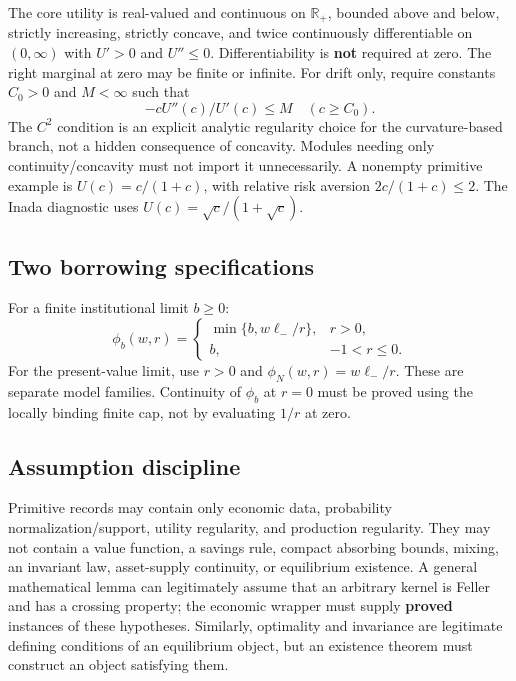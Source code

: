 \documentclass[
  11pt,
]{article}
\begin{document}
The core utility is real-valued and continuous on \(\mathbb R_+\),
bounded above and below, strictly increasing, strictly concave, and
twice continuously differentiable on \((0,\infty)\) with \(U'>0\) and
\(U''\leq0\). Differentiability is \textbf{not} required at zero. The
right marginal at zero may be finite or infinite. For drift only,
require constants \(C_0>0\) and \(M<\infty\) such that \[
-cU''(c)/U'(c)\leq M\quad(c\geq C_0).
\] The \(C^2\) condition is an explicit analytic regularity choice for
the curvature-based branch, not a hidden consequence of concavity.
Modules needing only continuity/concavity must not import it
unnecessarily. A nonempty primitive example is \(U(c)=c/(1+c)\), with
relative risk aversion \(2c/(1+c)\leq2\). The Inada diagnostic uses
\(U(c)=\sqrt c/(1+\sqrt c)\).

\subsection{Two borrowing
specifications}\label{two-borrowing-specifications}

For a finite institutional limit \(b\geq0\): \[
\phi_b(w,r)=\begin{cases}\min\{b,w\ell_-/r\},&r>0,\\b,&-1<r\leq0.\end{cases}
\] For the present-value limit, use \(r>0\) and
\(\phi_N(w,r)=w\ell_-/r\). These are separate model families. Continuity
of \(\phi_b\) at \(r=0\) must be proved using the locally binding finite
cap, not by evaluating \(1/r\) at zero.

\subsection{Assumption discipline}\label{assumption-discipline}

Primitive records may contain only economic data, probability
normalization/support, utility regularity, and production regularity.
They may not contain a value function, a savings rule, compact absorbing
bounds, mixing, an invariant law, asset-supply continuity, or
equilibrium existence. A general mathematical lemma can legitimately
assume that an arbitrary kernel is Feller and has a crossing property;
the economic wrapper must supply \textbf{proved} instances of these
hypotheses. Similarly, optimality and invariance are legitimate defining
conditions of an equilibrium object, but an existence theorem must
construct an object satisfying them.
\end{document}
